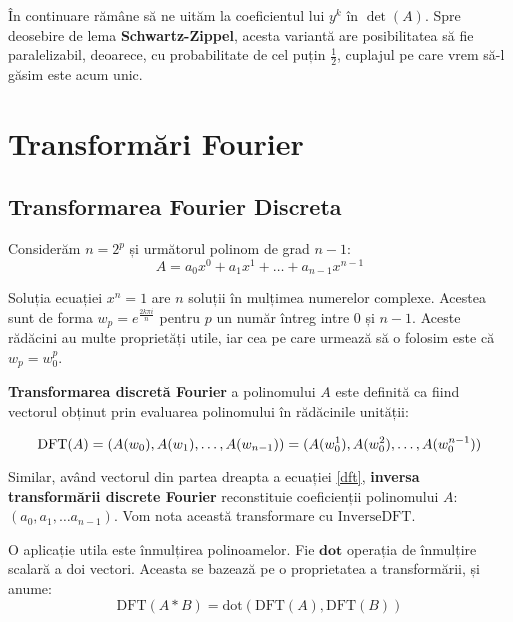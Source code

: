 În continuare rămâne să ne uităm la coeficientul lui $y^{k}$ în $\det(A)$. Spre
deosebire de lema \textbf{Schwartz-Zippel}, acesta variantă are posibilitatea să fie
paralelizabil, deoarece, cu probabilitate de cel puțin $\frac{1}{2}$, cuplajul
pe care vrem să-l găsim este acum unic.

\pagebreak

\section{Transformări Fourier}

\subsection{Transformarea Fourier Discreta \cite{fft}}
Considerăm $n = 2^{p}$ și următorul polinom de grad $n-1$:
\begin{equation}
  A = a_{0}x^{0} + a_{1}x^{1} + \ldots + a_{n-1}x^{n-1}
\end{equation}

Soluția ecuației $x^{n} = 1$ are $n$ soluții în mulțimea numerelor complexe.
Acestea sunt de forma $w_{p} = e^{\frac{2k\pi i}{n}}$ pentru $p$ un număr întreg
intre $0$ și $n-1$. Aceste rădăcini au multe proprietăți utile, iar cea pe care
urmează să o folosim este că $w_{p} = w_{0}^{p}$. \par
\textbf{Transformarea discretă Fourier} a polinomului $A$ este definită ca fiind
vectorul obținut prin evaluarea polinomului în rădăcinile unității:

\begin{equation}
  \label{dft}
  \text{DFT}(A) = (A(w_{0}), A(w_{1}), \ldots, A(w_{n-1})) \\
                = (A(w_{0}^{1}), A(w_{0}^{2}), \ldots, A(w_{0}^{n-1}))
\end{equation}

Similar, având vectorul din partea dreapta a ecuației \ref{dft}, \textbf{inversa
transformării discrete Fourier} reconstituie coeficienții polinomului $A$:
$(a_{0}, a_{1}, \ldots a_{n-1})$. Vom nota această transformare cu
$\text{InverseDFT}$. \par

O aplicație utila este înmulțirea polinoamelor. Fie $\textbf{dot}$ operația de
înmulțire scalară a doi vectori. Aceasta se bazează pe o
proprietatea a transformării, și anume:
\begin{equation}
  \text{DFT}(A * B) = \text{dot}(\text{DFT}(A), \text{DFT}(B))
\end{equation}

